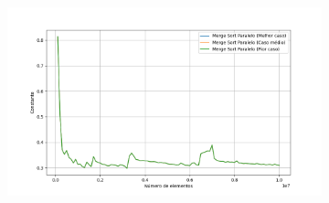 \documentclass[12pt]{article}
\begin{document}
\begin{figure}[H]
\begin{subfigure}{0.49\textwidth}
        \label{fig:imagem2}
    \end{subfigure}
    \begin{subfigure}{0.49\textwidth}
        \centering
        \includegraphics[width=\linewidth]{complexity_ascending_parallel_mergesort.png}
        \label{fig:imagem3}
    \end{subfigure}
    \label{fig:asc_c}
\end{figure}
\end{document}
